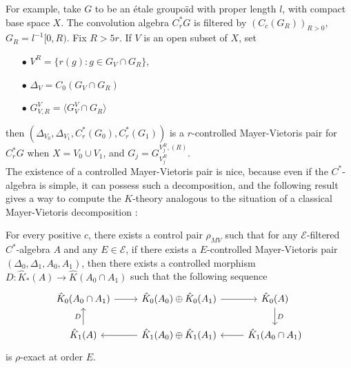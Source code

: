 For example, take $G$ to be an étale groupoïd with proper length $l$, with compact base space $X$. The convolution algebra $C^*_r G$ is filtered by $(C_c(G_R))_{R>0}$, $G_R=l^{-1}[0,R)$. Fix $R>5r$. If $V$ is an open subset of $X$, set \\

\begin{itemize}
\item[$\bullet$] $V^R= \{r(g) : g\in G_V\cap G_R\}$,
\item[$\bullet$] $\Delta_V = C_0(G_V\cap G_R)$
\item[$\bullet$] $G_{V,R}^V = \langle G_V^V \cap G_R \rangle$\\
\end{itemize} 

then $(\Delta_{V_0},\Delta_{V_1}, C_r^*(G_0),C_r^*(G_1))$ is a $r$-controlled Mayer-Vietoris pair for $C^*_r G$ when $X=V_0\cup V_1$, and $G_j = G_{V_j^R}^{V_j^R , (R)}$.\\

The existence of a controlled Mayer-Vietoris pair is nice, because even if the $C^*$-algebra is simple, it can possess such a decomposition, and the following result gives a way to compute the $K$-theory analogous to the situation of a classical Mayer-Vietoris decomposition :

\begin{thm}
For every positive $c$, there exists a control pair $\rho_{MV}$ such that for any $\mathcal E$-filtered $C^*$-algebra $A$ and any $E\in\mathcal E$, if there exists a $E$-controlled Mayer-Vietoris pair $(\Delta_0,\Delta_1,A_0,A_1)$, then there exists a controlled morphism $D : \hat K_*(A)\rightarrow \hat K(A_0\cap A_1)$ such that the following sequence 
\[\begin{tikzcd}
\hat K_0(A_0\cap A_1 ) \arrow{r}& \hat K_0(A_0)\arrow{r}\oplus \hat K_0(A_1) & \hat K_0(A)\arrow{d}{D} \\
\arrow{u}{D}\hat K_1(A) &\arrow{l} \hat K_1(A_0)\oplus \hat K_1(A_1) & \arrow{l}\hat K_1(A_0\cap A_1) 
\end{tikzcd}\]
is $\rho$-exact at order $E$.
\end{thm}

